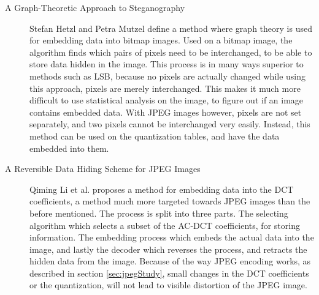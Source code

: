\begin{description}
	\item[A Graph-Theoretic Approach to Steganography]		
	Stefan Hetzl and Petra Mutzel define a method where graph theory is used for embedding data into bitmap images\citep{hetzl_2005}. 
	Used on a bitmap image, the algorithm finds which pairs of pixels need to be interchanged, to be able to store data hidden in the image. 
	This process is in many ways superior to methods such as LSB, because no pixels are actually changed while using this approach, pixels are merely interchanged.
	This makes it much more difficult to use statistical analysis on the image, to figure out if an image contains embedded data. 
	With JPEG images however, pixels are not set separately, and two pixels cannot be interchanged very easily. 
	Instead, this method can be used on the quantization tables, and have the data embedded into them.

	\item[A Reversible Data Hiding Scheme for JPEG Images]		
	Qiming Li et al. proposes a method for embedding data into the DCT coefficients\citep{Li2010}, a method much more targeted towards JPEG images than the before mentioned.
	The process is split into three parts. The selecting algorithm which selects a subset of the AC-DCT coefficients, for storing information. 
	The embedding process which embeds the actual data into the image, and lastly the decoder which reverses the process, and retracts the hidden data from the image. 
	Because of the way JPEG encoding works, as described in section \ref{sec:jpegStudy}, small changes in the DCT coefficients or the quantization, will not lead to visible distortion of the JPEG image.
\end{description}